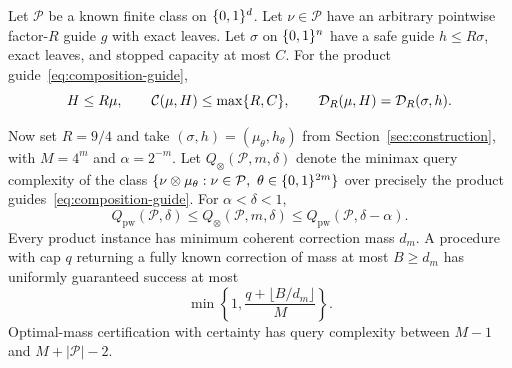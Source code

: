 \begin{theorem}\label{thm:composition}
Let $\mathcal P$ be a known finite class on $\{0,1\}^d$. Let $\nu\in\mathcal P$ have an arbitrary pointwise factor-$R$ guide $g$ with exact leaves. Let $\sigma$ on $\{0,1\}^n$ have a safe guide $h\le R\sigma$, exact leaves, and stopped capacity at most $C$. For the product guide~\eqref{eq:composition-guide},
\begin{equation}\label{eq:composition-budgets}
 H\le R\mu,\qquad \mathcal C(\mu,H)\le\max\{R,C\},\qquad
 \mathcal D_R(\mu,H)=\mathcal D_R(\sigma,h).
\end{equation}

Now set $R=9/4$ and take $(\sigma,h)=(\mu_\theta,h_\theta)$ from Section~\ref{sec:construction}, with $M=4^m$ and $\alpha=2^{-m}$. Let $Q_\otimes(\mathcal P,m,\delta)$ denote the minimax query complexity of the class $\{\nu\otimes\mu_\theta:\nu\in\mathcal P,\ \theta\in\bits^{2m}\}$ over precisely the product guides~\eqref{eq:composition-guide}. For $\alpha<\delta<1$,
\begin{equation}\label{eq:composition-sampling}
 Q_{\mathrm{pw}}(\mathcal P,\delta)
 \le Q_\otimes(\mathcal P,m,\delta)
 \le Q_{\mathrm{pw}}(\mathcal P,\delta-\alpha).
\end{equation}
Every product instance has minimum coherent correction mass $d_m$. A procedure with cap $q$ returning a fully known correction of mass at most $B\ge d_m$ has uniformly guaranteed success at most
\begin{equation}\label{eq:composition-cert}
 \min\left\{1,\frac{q+\lfloor B/d_m\rfloor}{M}\right\}.
\end{equation}
Optimal-mass certification with certainty has query complexity between $M-1$ and $M+|\mathcal P|-2$.
\end{theorem}
